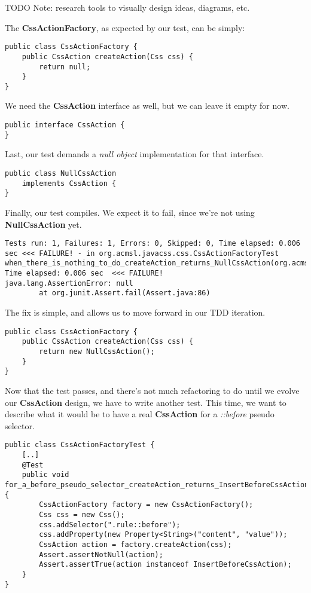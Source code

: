 \documentclass[11pt]{article}
\begin{document}
TODO Note: research tools to visually design ideas, diagrams, etc.

The \textbf{CssActionFactory}, as expected by our test, can be simply:

\begin{verbatim}
public class CssActionFactory {
    public CssAction createAction(Css css) {
        return null;
    }
}
\end{verbatim}

We need the \textbf{CssAction} interface as well, but we can leave it empty for now.

\begin{verbatim}
public interface CssAction {
}
\end{verbatim}

Last, our test demands a \emph{null object} implementation for that interface.

\begin{verbatim}
public class NullCssAction
    implements CssAction {
}
\end{verbatim}

Finally, our test compiles. We expect it to fail, since we're not using \textbf{NullCssAction} yet.

\begin{verbatim}
Tests run: 1, Failures: 1, Errors: 0, Skipped: 0, Time elapsed: 0.006 sec <<< FAILURE! - in org.acmsl.javacss.css.CssActionFactoryTest
when_there_is_nothing_to_do_createAction_returns_NullCssAction(org.acmsl.javacss.css.CssActionFactoryTest)  Time elapsed: 0.006 sec  <<< FAILURE!
java.lang.AssertionError: null
        at org.junit.Assert.fail(Assert.java:86)
\end{verbatim}

The fix is simple, and allows us to move forward in our TDD iteration.

\begin{verbatim}
public class CssActionFactory {
    public CssAction createAction(Css css) {
        return new NullCssAction();
    }
}
\end{verbatim}

Now that the test passes, and there's not much refactoring to do until we evolve our \textbf{CssAction} design, we have to
write another test. This time, we want to describe what it would be to have a real \textbf{CssAction} for a \emph{::before} pseudo selector.

\begin{verbatim}
public class CssActionFactoryTest {
    [..]
    @Test
    public void for_a_before_pseudo_selector_createAction_returns_InsertBeforeCssAction() {
        CssActionFactory factory = new CssActionFactory();
        Css css = new Css();
        css.addSelector(".rule::before");
        css.addProperty(new Property<String>("content", "value"));
        CssAction action = factory.createAction(css);
        Assert.assertNotNull(action);
        Assert.assertTrue(action instanceof InsertBeforeCssAction);
    }
}
\end{verbatim}
\end{document}
